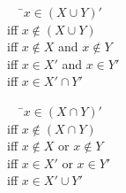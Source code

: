 \documentclass[../notes.tex]{subfiles}
\begin{document}
			\begin{example}
				\begin{tabbing}
					$\quad$ \=$x \in (X \cup Y)'$\\
					iff \>$x \notin (X \cup Y)$\\
					iff \>$x \notin X$ and $x \notin Y$\\
					iff \>$x \in X'$ and $x \in Y'$\\
					iff \>$x \in X' \cap Y'$
				\end{tabbing}
				\begin{tabbing}
					$\quad$ \=$x \in (X \cap Y)'$\\
					iff \> $x \notin (X \cap Y)$\\
					iff \> $x \notin X$ or $x \notin Y$\\
					iff \> $x \in X'$ or $x \in Y'$\\
					iff \> $x \in X' \cup Y'$
				\end{tabbing}
			\end{example}
			\pagebreak
\end{document}
